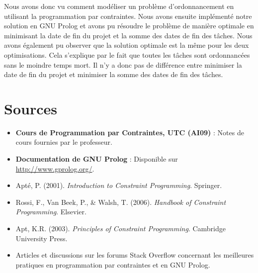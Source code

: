\documentclass{latexPackage/utc-report/utc-report}
\begin{document}
Nous avons donc vu comment modéliser un problème d'ordonnancement en utilisant la programmation par contraintes. Nous avons ensuite implémenté notre solution en GNU Prolog et avons pu résoudre le problème de manière optimale en minimisant la date de fin du projet et la somme des dates de fin des tâches. Nous avons également pu observer que la solution optimale est la même pour les deux optimisations. Cela s'explique par le fait que toutes les tâches sont ordonnancées sans le moindre temps mort. Il n'y a donc pas de différence entre minimiser la date de fin du projet et minimiser la somme des dates de fin des tâches.

\pagebreak

\section{Sources}

\begin{itemize}
    \item \textbf{Cours de Programmation par Contraintes, UTC (AI09)} : Notes de cours fournies par le professeur.
    \item \textbf{Documentation de GNU Prolog} : Disponible sur \url{http://www.gprolog.org/}.
    \item Apté, P. (2001). \textit{Introduction to Constraint Programming}. Springer.
    \item Rossi, F., Van Beek, P., \& Walsh, T. (2006). \textit{Handbook of Constraint Programming}. Elsevier.
    \item Apt, K.R. (2003). \textit{Principles of Constraint Programming}. Cambridge University Press.
    \item Articles et discussions sur les forums Stack Overflow concernant les meilleures pratiques en programmation par contraintes et en GNU Prolog.
\end{itemize}

\pagebreak

\listoffigures
\end{document}
